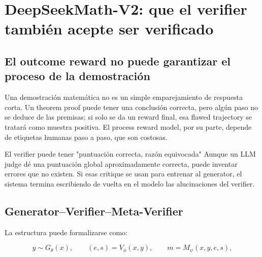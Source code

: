 \documentclass[a4paper]{article}
\begin{document}
\section{DeepSeekMath-V2: que el verifier también acepte ser verificado}

\subsection{El outcome reward no puede garantizar el proceso de la demostración}



Una demostración matemática no es un simple emparejamiento de respuesta corta. Un theorem proof puede tener una conclusión correcta, pero algún paso no se deduce de las premisas; si solo se da un reward final, esa flawed trajectory se tratará como muestra positiva. El process reward model, por su parte, depende de etiquetas humanas paso a paso, que son costosas.

\begin{warningbox}{El verifier puede tener "puntuación correcta, razón equivocada"}
Aunque un LLM judge dé una puntuación global aproximadamente correcta, puede inventar errores que no existen. Si esas critique se usan para entrenar al generator, el sistema termina escribiendo de vuelta en el modelo las alucinaciones del verifier.
\end{warningbox}

\subsection{Generator--Verifier--Meta-Verifier}


La estructura puede formalizarse como:

$$
y\sim G_\theta(x),\qquad
(e,s)=V_\phi(x,y),\qquad
m=M_\psi(x,y,e,s),
$$
\end{document}
